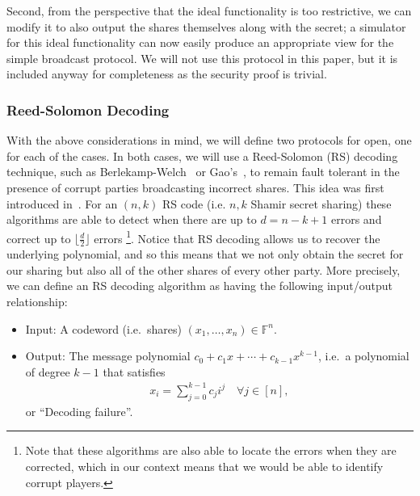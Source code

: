 \documentclass{article}
\newcommand\paper{paper}
\newcommand{\seq}[1]{\left[#1\right]}
\theoremstyle{remark}
\newcommand{\F}{\mathbb{F}}
\begin{document}
Second, from the perspective that the ideal functionality is too restrictive,
we can modify it to also output the shares themselves along with the secret; a
simulator for this ideal functionality can now easily produce an appropriate
view for the simple broadcast protocol. We will not use this protocol in this
\paper{}, but it is included anyway for completeness as the security proof is
trivial.

\subsubsection{Reed-Solomon Decoding}

With the above considerations in mind, we will define two protocols for open,
one for each of the cases. In both cases, we will use a Reed-Solomon (RS)
decoding technique, such as Berlekamp-Welch~\cite{welch_1986} or
Gao's~\cite{gao_2003}, to remain fault tolerant in the presence of corrupt
parties broadcasting incorrect shares. This idea was first introduced
in~\cite{ms81}. For an $(n, k)$ RS code (i.e. $n, k$ Shamir secret sharing)
these algorithms are able to detect when there are up to $d = n - k + 1$ errors
and correct up to $\lfloor \frac{d}{2} \rfloor$ errors%
\footnote{%
	Note that these algorithms are also able to locate the errors when they are
	corrected, which in our context means that we would be able to identify
	corrupt players.
}.
Notice that RS decoding allows us to recover the underlying polynomial, and so
this means that we not only obtain the secret for our sharing but also all of
the other shares of every other party. More precisely, we can define an RS
decoding algorithm as having the following input/output relationship:

\begin{itemize}
	\item Input: A codeword (i.e.\ shares) $(x_1, \ldots, x_n) \in \F^n$.
	\item Output: The message polynomial $c_0 + c_1 x + \cdots + c_{k-1}
		x^{k-1}$, i.e.\ a polynomial of degree $k-1$ that satisfies
		\begin{align*}
			x_i = \sum_{j=0}^{k-1} c_j i^j \quad \forall j \in \seq{n},
		\end{align*}
		or ``Decoding failure''.
\end{itemize}
\end{document}
